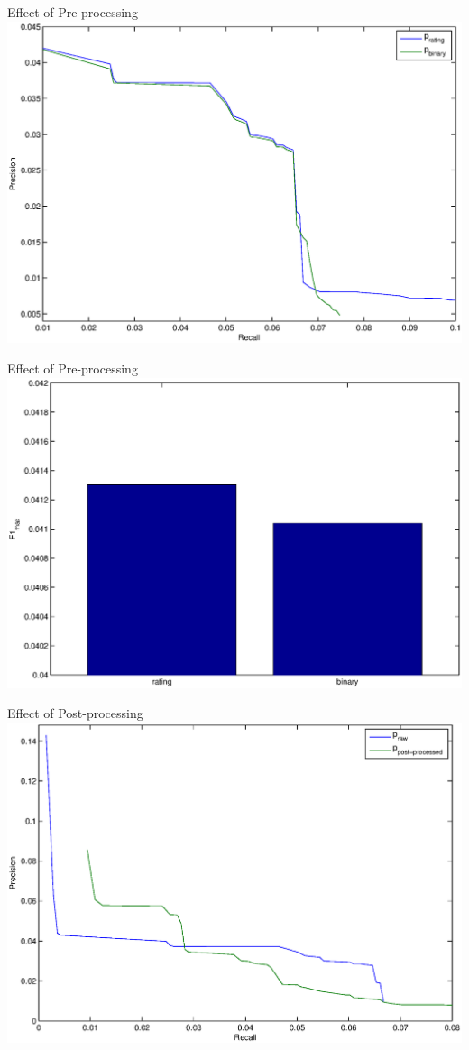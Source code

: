 \documentclass{beamer}
\begin{document}
\begin{frame}{Effect of Pre-processing}
\includegraphics[width=\linewidth]{./rating.eps}
\end{frame}

\begin{frame}{Effect of Pre-processing}
\includegraphics[width=\linewidth]{./rating_f1.eps}
\end{frame}


\begin{frame}{Effect of Post-processing}
\includegraphics[width=\linewidth]{./post-proc.eps}
\end{frame}
\end{document}
